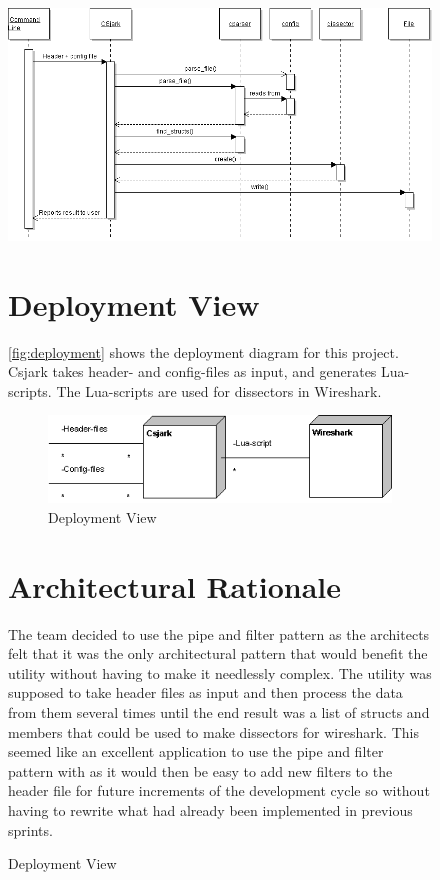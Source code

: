 \begin{figure}[ht]
\includegraphics[width=\textwidth]{./planning/img/SequenceDiagram.png}
\caption{Data flow during regular execution}
\label{fig:processview}

\section{Deployment View}
\autoref{fig:deployment} shows the deployment diagram for this project. Csjark takes header- and config-files as input, and generates Lua-scripts. The Lua-scripts are used for dissectors in Wireshark.

\begin{figure}[ht]
\includegraphics[width = \textwidth]{./planning/img/Deployment}
\caption{Deployment View} 
\label{fig:deployment}
\end{figure}

\section{Architectural Rationale}
The team decided to use the pipe and filter pattern as the architects felt that it was the only architectural pattern that would benefit the utility without having to make it needlessly complex. The utility was supposed to take header files as input and then process the data from them several times until the end result was a list of structs and members that could be used to make dissectors for wireshark. This seemed like an excellent application to use the pipe and filter pattern with as it would then be easy to add new filters to the header file for future increments of the development cycle so without having to rewrite what had already been implemented in previous sprints.


\end{figure}
